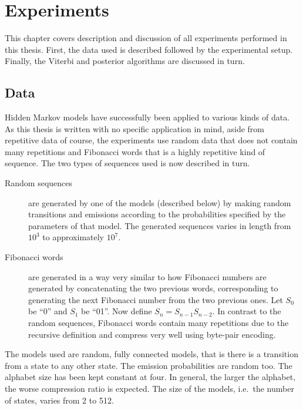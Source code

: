 \chapter{Experiments}
\label{cha:experiments}

This chapter covers description and discussion of all experiments performed in
this thesis. First, the data used is described followed by the experimental
setup. Finally, the Viterbi and posterior algorithms are discussed in turn.

\section{Data}

Hidden Markov models have successfully been applied to various kinds of
data.  As this thesis is written with no specific application in mind, aside
from repetitive data of course, the experiments use random data that does not
contain many repetitions and Fibonacci words that is a highly repetitive kind
of sequence.  The two types of sequences used is now described in turn.

\begin{description}
\item[Random sequences] are generated by one of the models (described below) by
  making random transitions and emissions according to the probabilities
  specified by the parameters of that model.  The generated sequences varies in
  length from $10^3$ to approximately $10^7$. 
\item[Fibonacci words] are generated in a way very similar to how Fibonacci
  numbers are generated by concatenating the two previous words, corresponding
  to generating the next Fibonacci number from the two previous ones. Let $S_0$
  be ``0'' and $S_1$ be ``01''. Now define $S_n=S_{n-1}S_{n-2}$. In contrast to
  the random sequences, Fibonacci words contain many repetitions due to the
  recursive definition and compress very well using byte-pair encoding. 
\end{description}

The models used are random, fully connected models, that is there is a
transition from a state to any other state. The emission probabilities are
random too. The alphabet size has been kept constant at four. In general, the
larger the alphabet, the worse compression ratio is expected. The size of the
models, i.e.\ the number of states, varies from 2 to 512.

